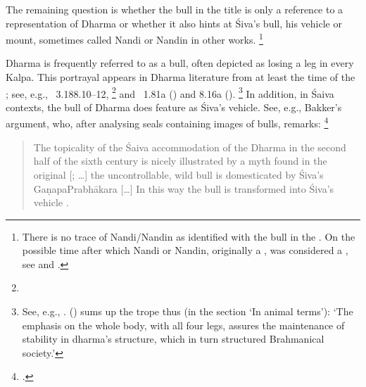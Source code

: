 The\label{bull} remaining question is whether the bull in the title 
is only a reference to a representation of Dharma 
or whether it also hints at Śiva's bull, his vehicle or mount,
sometimes called Nandi or Nandin in other works.%
		\footnote{There is no trace of Nandi/Nandin
		as identified with the bull in the \Vss.
		On the possible time after which 
		Nandi or Nandin, originally a ,
		was considered a , see 
		 and 
		.}

Dharma is frequently referred to as a bull, 
often depicted as losing a leg in every Kalpa.
This portrayal appears in Dharma literature from at least the time of the \MBh;
see, e.g., \MBH\ 3.188.10--12,%
	\footnote{}
and \Manu\ 1.81a
() and 8.16a
().%
	 \footnote{See, e.g., .
	 \citeauthor{GutierrezEmbodiment} (\citeyear{GutierrezEmbodiment})
	 sums up the trope thus
	 (in the section `In animal terms'): 
	 `The emphasis on the whole body, with all four legs, assures 
	 the maintenance of stability in dharma's structure, which in 
	 turn structured Brahmanical society.'}
In addition, in Śaiva contexts, the bull of Dharma
does feature as Śiva's vehicle. See, e.g., Bakker's argument, who,
after analysing seals containing images of bulls, remarks:%
                \footnote{.}


\begin{quote}
The topicality of the Śaiva accommodation 
of the Dharma in the second half of the 
sixth century is nicely illustrated by a myth found in the
original [; \dots]
the uncontrollable, wild bull  is 
domesticated by Śiva's Gaṇapa\linebreak Prabhākara [\dots]
In this way the bull is transformed into Śiva’s vehicle . 
\end{quote}

